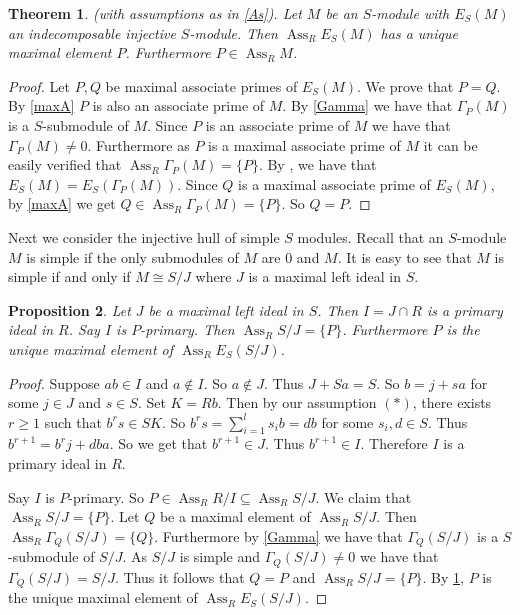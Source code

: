 \documentclass{amsart}
\theoremstyle{plain}
\newtheorem{theorem}{Theorem}[section]
\newtheorem{proposition}[theorem]{Proposition}
\theoremstyle{definition}
\theoremstyle{remark}
\numberwithin{equation}{theorem}
\begin{document}
\begin{theorem}\label{ind}
(with assumptions as in \ref{As}). Let $M$ be an $S$-module with $E_S(M)$ an indecomposable injective $S$-module. Then
${\operatorname{Ass}}_R E_S(M)$ has a unique maximal element $P$. Furthermore $P \in {\operatorname{Ass}}_R M$.
\end{theorem}
\begin{proof}
Let $P, Q$ be maximal associate primes of $E_S(M)$. We prove that $P = Q$.
By \ref{maxA} $P$ is also an associate prime of $M$.
By \ref{Gamma} we have that $\Gamma_P(M)$  is a $S$-submodule of $M$.
Since $P$ is an associate prime of $M$ we have that $\Gamma_P(M) \neq 0$. Furthermore as $P$ is a maximal associate prime of $M$ it can be easily
verified that ${\operatorname{Ass}}_R \Gamma_P(M) = \{ P \}$. By \cite[2.2]{Matlis}, we have that $E_S(M) = E_S(\Gamma_P(M))$. Since $Q$ is a maximal associate prime
of $E_S(M)$, by \ref{maxA} we get $Q \in {\operatorname{Ass}}_R \Gamma_P(M) = \{ P \}$. So $Q = P$.
\end{proof}
Next we consider the injective hull of simple $S$ modules. Recall that an $S$-module $M$ is simple if the only submodules of $M$ are $0$ and $M$. It is easy to see that $M$ is simple if and only if $M \cong S/J$ where $J$ is a maximal left ideal in $S$.
\begin{proposition}
Let $J$ be a maximal left ideal in $S$. Then $I = J \cap R$ is a primary ideal in $R$. Say $I$ is $P$-primary. Then ${\operatorname{Ass}}_R S/J = \{ P \}$. Furthermore $P$ is the unique maximal element of ${\operatorname{Ass}} _R E_S(S/J)$.
\end{proposition}
\begin{proof}
Suppose $ab \in I$ and $a \notin I$. So $a \notin J$. Thus $J + Sa = S$. So $b = j + sa$ for some $j \in J$ and $s \in S$. Set $K = Rb$. Then by our assumption $(*)$, there exists
$r \geq 1$ such that $b^rs \in SK$. So $b^rs = \sum_{i = 1}^{l}s_ib = db$ for some $s_i,d \in S$. Thus $b^{r+1} = b^rj + dba$. So we get that
$b^{r+1} \in J$. Thus $b^{r+1} \in I$. Therefore  $I$ is a primary ideal in $R$.

Say $I$ is $P$-primary. So $P \in {\operatorname{Ass}}_R R/I \subseteq {\operatorname{Ass}}_R S/J$. We claim that ${\operatorname{Ass}}_R S/J = \{ P \}$. Let $Q$ be a maximal element of ${\operatorname{Ass}}_R S/J$.
Then ${\operatorname{Ass}}_R \Gamma_Q(S/J) = \{Q \}$. Furthermore by  \ref{Gamma} we have that $\Gamma_Q(S/J)$  is a $S$-submodule of $S/J$. As $S/J$ is simple and
$\Gamma_Q(S/J) \neq 0  $ we have that $\Gamma_Q(S/J) = S/J$. Thus it follows that $Q = P$ and    ${\operatorname{Ass}}_R S/J = \{ P \}$. By \ref{ind},
$P$ is the unique maximal element of ${\operatorname{Ass}}_R E_S(S/J)$.
\end{proof}
\end{document}
